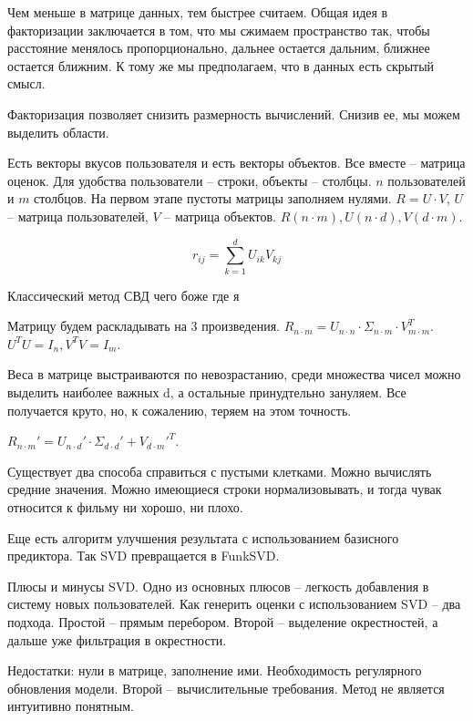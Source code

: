  Чем меньше в матрице данных, тем быстрее считаем. Общая идея в факторизации заключается в том, что мы сжимаем пространство так, чтобы расстояние менялось пропорционально, дальнее остается дальним, ближнее остается ближним. К тому же мы предполагаем, что в данных есть скрытый смысл.

 Факторизация позволяет снизить размерность вычислений. Снизив ее, мы можем выделить области.

 Есть векторы вкусов пользователя и есть векторы объектов. Все вместе -- матрица оценок. Для удобства пользователи -- строки, объекты -- столбцы. $n$ пользователей и $m$ столбцов. На первом этапе пустоты матрицы заполняем нулями. $R = U \cdot V$, $U$ -- матрица пользователей, $V$ -- матрица объектов. $R (n \cdot m), U (n \cdot d), V (d \cdot m)$.

 \begin{equation}
    r_{ij} = \sum_{k = 1}^{d}{U_{ik}V_{kj}}
 \end{equation}

 Классический метод СВД чего боже где я

 Матрицу будем раскладывать на 3 произведения. $R_{n\cdot m}=U_{n\cdot n} \cdot \Sigma_{n \cdot m} \cdot V_{m \cdot m}^T$. $U^TU = I_n, V^TV = I_m$.

 Веса в матрице выстраиваются по невозрастанию, среди множества чисел можно выделить наиболее важных d, а остальные принудтельно зануляем. Все получается круто, но, к сожалению, теряем на этом точность.

 $R_{n \cdot m}' = U_{n \cdot d}' \cdot \Sigma_{d \cdot d}' + V_{d \cdot m}'^{T}$.

 Существует два способа справиться с пустыми клетками. Можно вычислять средние значения. Можно имеющиеся строки нормализовывать, и тогда чувак относится к фильму ни хорошо, ни плохо.

 Еще есть алгоритм улучшения результата с использованием базисного предиктора. Так SVD превращается в FunkSVD.

 Плюсы и минусы SVD. Одно из основных плюсов -- легкость добавления в систему новых пользователей. Как генерить оценки с использованием SVD -- два подхода. Простой -- прямым перебором. Второй -- выделение окрестностей, а дальше уже фильтрация в окрестности.

 Недостатки: нули в матрице, заполнение ими. Необходимость регулярного обновления модели. Второй -- вычислительные требования. Метод не является интуитивно понятным. 


